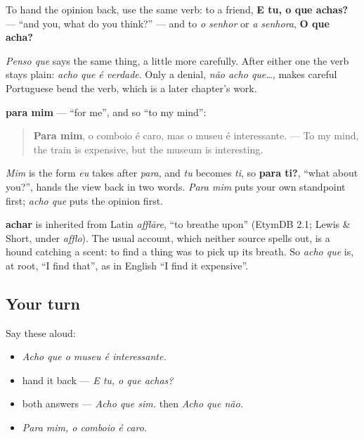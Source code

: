 To hand the opinion back, use the same verb: to a friend, \textbf{E tu, o que achas?} — \textquotedblleft{}and you, what do you think?\textquotedblright{} — and to \emph{o senhor} or \emph{a senhora}, \textbf{O que acha?}

\emph{Penso que} says the same thing, a little more carefully. After either one the verb stays plain: \emph{acho que é verdade}. Only a denial, \emph{não acho que…}, makes careful Portuguese bend the verb, which is a later chapter's work.

\begin{grammarlens}[title={Grammar Lens: para mim}]
\textbf{para mim} — \textquotedblleft{}for me\textquotedblright{}, and so \textquotedblleft{}to my mind\textquotedblright{}:

\begin{quote}
\textbf{Para mim}, o comboio é caro, mas o museu é interessante. — To my mind, the train is expensive, but the museum is interesting.
\end{quote}

\emph{Mim} is the form \emph{eu} takes after \emph{para}, and \emph{tu} becomes \emph{ti}, so \textbf{para ti?}, \textquotedblleft{}what about you?\textquotedblright{}, hands the view back in two words. \emph{Para mim} puts your own standpoint first; \emph{acho que} puts the opinion first.
\end{grammarlens}

\begin{cousinweb}
\textbf{achar} is inherited from Latin \emph{afflāre}, \textquotedblleft{}to breathe upon\textquotedblright{} (EtymDB 2.1; Lewis \& Short, under \emph{afflo}). The usual account, which neither source spells out, is a hound catching a scent: to find a thing was to pick up its breath. So \emph{acho que} is, at root, \textquotedblleft{}I find that\textquotedblright{}, as in English \textquotedblleft{}I find it expensive\textquotedblright{}.
\end{cousinweb}

\subsection*{Your turn}
Say these aloud:

\begin{itemize}
\raggedright
  \item \emph{Acho que o museu é interessante.}
  \item hand it back — \emph{E tu, o que achas?}
  \item both answers — \emph{Acho que sim.} then \emph{Acho que não.}
  \item \emph{Para mim, o comboio é caro.}
\end{itemize}

